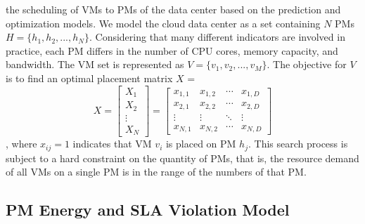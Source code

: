 \documentclass[conference]{{IEEEtran}}
\begin{document}
the scheduling of VMs to PMs of the data center based on the prediction and optimization models. We model the cloud data center as a set containing $N$ PMs $H=\{h_{1}, h_{2}, ..., h_{N}\}$.  Considering that many different indicators are involved in practice,  each PM differs in the number of CPU cores,  memory capacity, and bandwidth. The VM set is represented as $V=\{v_{1}, v_{2}, ..., v_{M}\}$.  The objective for $V$ is to find an optimal placement matrix $X$ = \begin{equation}
X = 
\begin{bmatrix}
    X_1 \\
    X_2 \\
    \vdots \\
    X_N
\end{bmatrix}
=
\begin{bmatrix}
    x_{1,1} & x_{1,2} & \cdots & x_{1,D} \\
    x_{2,1} & x_{2,2} & \cdots & x_{2,D} \\
    \vdots  & \vdots  & \ddots & \vdots \\
    x_{N,1} & x_{N,2} & \cdots & x_{N,D}
\end{bmatrix}
\label{eq:population_matrix}
\end{equation} , where $x_{ij}=1$ indicates that VM $v_i$ is placed on PM $h_j$.  This search process is subject to a hard constraint on the quantity of PMs,  that is,  the resource demand of all VMs on a single PM is in the range of the numbers of that PM.

\subsection{PM Energy and SLA Violation Model}
\end{document}
